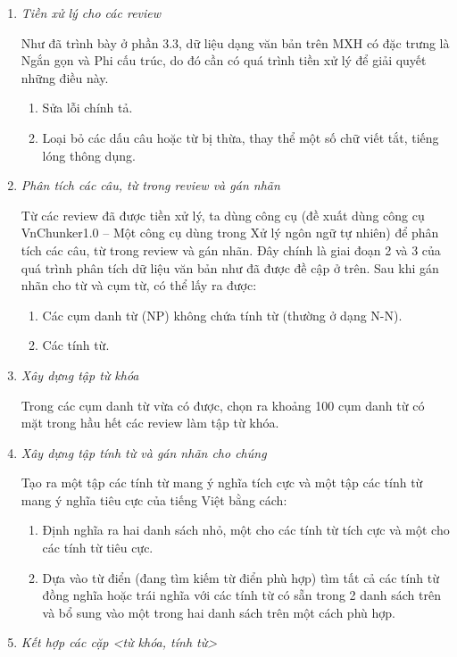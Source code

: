 \documentclass[12pt]{extarticle}
\begin{document}
			 	\begin{enumerate}
					\item \textit{Tiền xử lý cho các review}
						\par Như đã trình bày ở phần 3.3, dữ liệu dạng văn bản trên MXH có đặc trưng là Ngắn gọn và Phi cấu trúc, do đó cần có quá trình tiền xử lý để giải quyết những điều này.
						\begin{enumerate}
							\item Sửa lỗi chính tả.
							\item 	Loại bỏ các dấu câu hoặc từ bị thừa, thay thể một số chữ viết tắt, tiếng lóng thông dụng.
						\end{enumerate}
					\item \textit{Phân tích các câu, từ trong review và gán nhãn}
						\par Từ các review đã được tiền xử lý, ta dùng công cụ (đề xuất dùng công cụ VnChunker1.0 – Một công cụ dùng trong Xử lý ngôn ngữ tự nhiên) để phân tích các câu, từ trong review và gán nhãn. Đây chính là giai đoạn 2 và 3 của quá trình phân tích dữ liệu văn bản như đã được đề cập ở trên. Sau khi gán nhãn cho từ và cụm từ, có thể lấy ra được:
						\begin{enumerate}
							\item Các cụm danh từ (NP) không chứa tính từ (thường ở dạng N-N).
							\item Các tính từ.
						\end{enumerate}
					\item \textit{Xây dựng tập từ khóa}
						\par Trong các cụm danh từ vừa có được, chọn ra khoảng 100 cụm danh từ có mặt trong hầu hết các review làm tập từ khóa.
					\item\textit{ Xây dựng tập tính từ và gán nhãn cho chúng}
						\par Tạo ra một tập các tính từ mang ý nghĩa tích cực và một tập các tính từ mang ý nghĩa tiêu cực của tiếng Việt bằng cách:
						\begin{enumerate}
							\item Định nghĩa ra hai danh sách nhỏ, một cho các tính từ tích cực và một cho các tính từ tiêu cực.
							\item Dựa vào từ điển (đang tìm kiếm từ điển phù hợp) tìm tất cả các tính từ đồng nghĩa hoặc trái nghĩa với các tính từ có sẵn trong 2 danh sách trên và bổ sung vào một trong hai danh sách trên một cách phù hợp.
						\end{enumerate}
					\item \textit{Kết hợp các cặp <từ khóa, tính từ>}

\end{enumerate}
\end{document}
